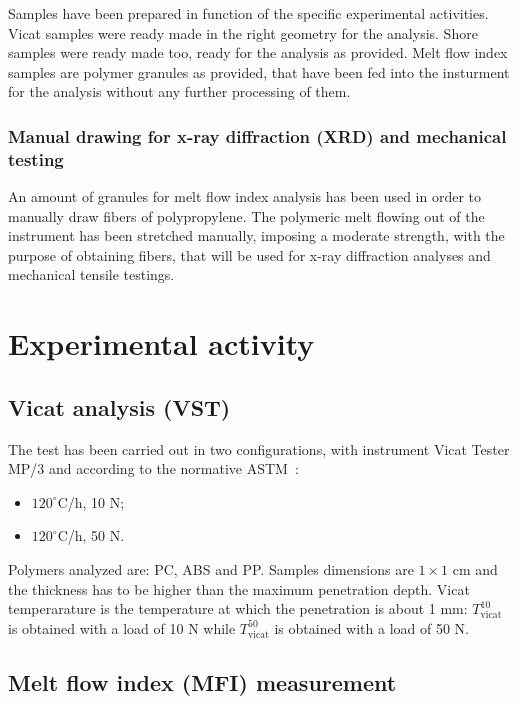 \documentclass[a4paper, 11pt]{article}
\begin{document}
Samples have been prepared in function of the specific experimental activities. Vicat samples were ready made in the right geometry for the analysis. Shore samples were ready made too, ready for the analysis as provided. Melt flow index samples are polymer granules as provided, that have been fed into the insturment for the analysis without any further processing of them. 

\subsubsection{Manual drawing for x-ray diffraction (XRD) and mechanical testing}

An amount of granules for melt flow index analysis has been used in order to manually draw fibers of polypropylene. The polymeric melt flowing out of the instrument has been stretched manually, imposing a moderate strength, with the purpose of obtaining fibers, that will be used for x-ray diffraction analyses and mechanical tensile testings.  

\section{Experimental activity}

\subsection{Vicat analysis (VST)}

The test has been carried out in two configurations, with instrument Vicat Tester MP/3 and according to the normative ASTM~\cite{VICAT}:

\begin{itemize}

\item $120^\circ$C/h, 10 N;

\item $120^\circ$C/h, 50 N.

\end{itemize}
Polymers analyzed are: PC, ABS and PP. Samples dimensions are $1\times1$ cm and the thickness has to be higher than the maximum penetration depth. Vicat temperarature is the temperature at which the penetration is about 1 mm: $T_\text{vicat}^\text{10}$ is obtained with a load of 10 N while $T_\text{vicat}^\text{50}$ is obtained with a load of 50 N. 

\subsection{Melt flow index (MFI) measurement}
\end{document}
